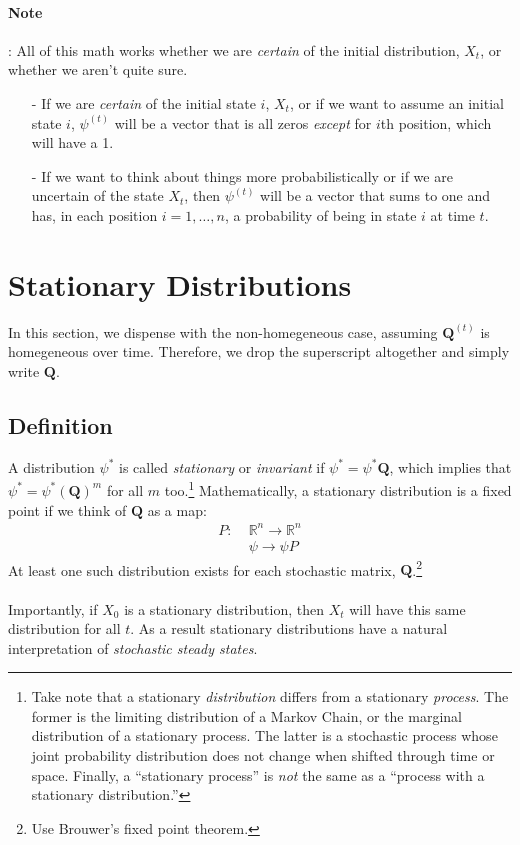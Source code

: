 \documentclass[a4paper,12pt]{scrartcl}
\begin{document}
\paragraph{Note}: All of this math works whether we are 
\emph{certain} of the initial distribution, $X_t$, or
whether we aren't quite sure.  
\begin{itemize}
    \item[-] If we are \emph{certain} of the initial state $i$, 
	$X_t$, or if we want to assume an initial state $i$,
	$\psi^{(t)}$ will be a vector that is all zeros
	\emph{except} for $i$th position, which will have a 1.
    \item[-] If we want to think about things more probabilistically
	or if we are uncertain of the state $X_t$, then
	$\psi^{(t)}$ will be a vector that sums to one and
	has, in each position $i=1,\ldots, n$, a probability
	of being in state $i$ at time $t$.
\end{itemize}


\newpage
\section{Stationary Distributions}

In this section, we dispense with the non-homegeneous
case, assuming $\mathbf{Q}^{(t)}$ is homegeneous
over time. Therefore, we drop the superscript altogether
and simply write $\mathbf{Q}$.

\subsection{Definition}

A distribution $\psi^*$ is called {\sl stationary} or 
{\sl invariant} if $\psi^* = \psi^* \mathbf{Q}$,
which implies that $\psi^* = \psi^* \left(\mathbf{Q}\right)^m$
for all $m$ too.\footnote{Take note that a stationary 
    \emph{distribution} differs from a stationary \emph{process}.
    The former is the limiting distribution of a Markov Chain,
    or the marginal distribution of a stationary process. The
    latter is a stochastic process whose joint probability 
    distribution does not change when shifted through time or
    space.  Finally, a ``stationary process'' is \emph{not} the
    same as a ``process with a stationary distribution.''}
Mathematically, a stationary distribution
is a fixed point if we think of $\mathbf{Q}$ as a map:
\begin{align*}
    P: \; &\mathbb{R}^n \rightarrow \mathbb{R}^n \\
    &\psi \rightarrow \psi P
\end{align*}
At least one such distribution exists for each stochastic
matrix, $\mathbf{Q}$.\footnote{Use Brouwer's fixed point theorem.}
\\
\\
Importantly, if $X_0$ is a stationary distribution,
then $X_t$ will have this same distribution for all $t$.
As a result stationary distributions have a natural
interpretation of \emph{stochastic steady states}.
\end{document}
